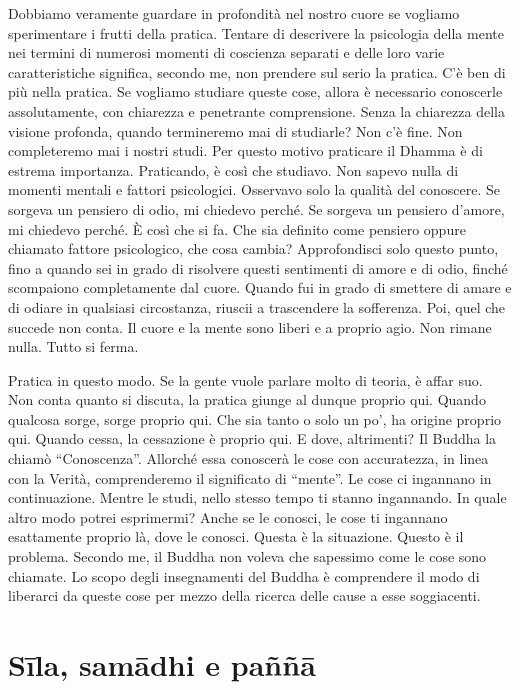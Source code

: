 Dobbiamo veramente guardare in profondità nel nostro cuore se vogliamo
sperimentare i frutti della pratica. Tentare di descrivere la psicologia
della mente nei termini di numerosi momenti di coscienza separati e
delle loro varie caratteristiche significa, secondo me, non prendere sul
serio la pratica. C'è ben di più nella pratica. Se vogliamo studiare
queste cose, allora è necessario conoscerle assolutamente, con chiarezza
e penetrante comprensione. Senza la chiarezza della visione profonda,
quando termineremo mai di studiarle? Non c'è fine. Non completeremo mai
i nostri studi. Per questo motivo praticare il Dhamma è di estrema
importanza. Praticando, è così che studiavo. Non sapevo nulla di momenti
mentali e fattori psicologici. Osservavo solo la qualità del conoscere.
Se sorgeva un pensiero di odio, mi chiedevo perché. Se sorgeva un
pensiero d'amore, mi chiedevo perché. È così che si fa. Che sia definito
come pensiero oppure chiamato fattore psicologico, che cosa cambia?
Approfondisci solo questo punto, fino a quando sei in grado di risolvere
questi sentimenti di amore e di odio, finché scompaiono completamente
dal cuore. Quando fui in grado di smettere di amare e di odiare in
qualsiasi circostanza, riuscii a trascendere la sofferenza. Poi, quel
che succede non conta. Il cuore e la mente sono liberi e a proprio agio.
Non rimane nulla. Tutto si ferma.

Pratica in questo modo. Se la gente vuole parlare molto di teoria, è
affar suo. Non conta quanto si discuta, la pratica giunge al dunque
proprio qui. Quando qualcosa sorge, sorge proprio qui. Che sia tanto o
solo un po', ha origine proprio qui. Quando cessa, la cessazione è
proprio qui. E dove, altrimenti? Il Buddha la chiamò ``Conoscenza''.
Allorché essa conoscerà le cose con accuratezza, in linea con la Verità,
comprenderemo il significato di ``mente''. Le cose ci ingannano in
continuazione. Mentre le studi, nello stesso tempo ti stanno ingannando.
In quale altro modo potrei esprimermi? Anche se le conosci, le cose ti
ingannano esattamente proprio là, dove le conosci. Questa è la
situazione. Questo è il problema. Secondo me, il Buddha non voleva che
sapessimo come le cose sono chiamate. Lo scopo degli insegnamenti del
Buddha è comprendere il modo di liberarci da queste cose per mezzo della
ricerca delle cause a esse soggiacenti.

\section{Sīla, samādhi e paññā}

